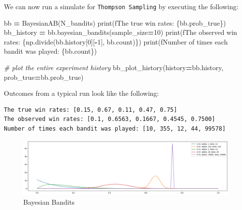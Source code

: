 \documentclass[
]{book}
\newenvironment{Shaded}{\begin{snugshade}}{\end{snugshade}}
\newcommand{\BuiltInTok}[1]{#1}
\newcommand{\CommentTok}[1]{\textcolor[rgb]{0.56,0.35,0.01}{\textit{#1}}}
\newcommand{\DecValTok}[1]{\textcolor[rgb]{0.00,0.00,0.81}{#1}}
\newcommand{\NormalTok}[1]{#1}
\newcommand{\OperatorTok}[1]{\textcolor[rgb]{0.81,0.36,0.00}{\textbf{#1}}}
\newcommand{\SpecialCharTok}[1]{\textcolor[rgb]{0.00,0.00,0.00}{#1}}
\newcommand{\SpecialStringTok}[1]{\textcolor[rgb]{0.31,0.60,0.02}{#1}}
\theoremstyle{definition}
\theoremstyle{definition}
\theoremstyle{definition}
\theoremstyle{definition}
\theoremstyle{remark}
\begin{document}
We can now run a simulate for \texttt{Thompson\ Sampling} by executing the following:

\begin{Shaded}
\begin{Highlighting}[]
\NormalTok{bb }\OperatorTok{=}\NormalTok{ BayesianAB(N\_bandits)}
\BuiltInTok{print}\NormalTok{(}\SpecialStringTok{f\textquotesingle{}The true win rates: }\SpecialCharTok{\{}\NormalTok{bb}\SpecialCharTok{.}\NormalTok{prob\_true}\SpecialCharTok{\}}\SpecialStringTok{\textquotesingle{}}\NormalTok{)}
\NormalTok{bb\_history }\OperatorTok{=}\NormalTok{ bb.bayesian\_bandits(sample\_size}\OperatorTok{=}\DecValTok{10}\NormalTok{)}
\BuiltInTok{print}\NormalTok{(}\SpecialStringTok{f\textquotesingle{}The observed win rates: }\SpecialCharTok{\{}\NormalTok{np}\SpecialCharTok{.}\NormalTok{divide(bb.history[}\DecValTok{0}\NormalTok{][}\OperatorTok{{-}}\DecValTok{1}\NormalTok{], bb.count)}\SpecialCharTok{\}}\SpecialStringTok{\textquotesingle{}}\NormalTok{)}
\BuiltInTok{print}\NormalTok{(}\SpecialStringTok{f\textquotesingle{}Number of times each bandit was played: }\SpecialCharTok{\{}\NormalTok{bb}\SpecialCharTok{.}\NormalTok{count}\SpecialCharTok{\}}\SpecialStringTok{\textquotesingle{}}\NormalTok{)}

\CommentTok{\# plot the entire experiment history}
\NormalTok{bb\_plot\_history(history}\OperatorTok{=}\NormalTok{bb.history, prob\_true}\OperatorTok{=}\NormalTok{bb.prob\_true)}
\end{Highlighting}
\end{Shaded}

Outcomes from a typical run look like the following:

\begin{verbatim}
The true win rates: [0.15, 0.67, 0.11, 0.47, 0.75]
The observed win rates: [0.1, 0.6563, 0.1667, 0.4545, 0.7500]
Number of times each bandit was played: [10, 355, 12, 44, 99578]
\end{verbatim}

\begin{figure}
\centering
\includegraphics{images/bb.png}
\caption{Bayesian Bandits}
\end{figure}
\end{document}
